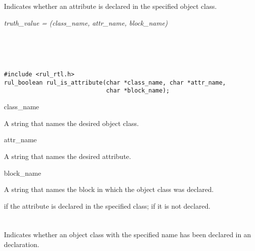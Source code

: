 \section*{}

Indicates whether an attribute is declared in the specified object
class.

\Syntax

\it{truth\_value} = (\it{class\_name},
\it{attr\_name}, \it{block\_name})

\begin{args}
   \\
   \\
   \\
\end{args}

\CBinding
\begin{verbatim}
#include <rul_rtl.h>
rul_boolean rul_is_attribute(char *class_name, char *attr_name, 
                             char *block_name);
\end{verbatim}

\begin{arguments}
\item[class\_name]

  A string that names the desired object class.

\item[attr\_name]

  A string that names the desired attribute.

\item[block\_name]

  A string that names the block in which the object class was
  declared.
\end{arguments}

\ReturnValue

 if the attribute is declared in the specified class;
 if it is not declared.

\begin{seealso}
\end{seealso}

\section*{}

Indicates whether an object class with the specified name has been
declared in an  declaration.

